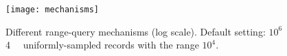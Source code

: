 \begin{figure}[!ht]
	\centering
	\texttt{[image: mechanisms]}
	\caption[Different range-query mechanisms]{
		Different range-query mechanisms (log scale).
		Default setting: $10^6$ \SI{4}{\kibi\byte} uniformly-sampled records with the range $10^4$.
	}%
	\label{figure:mechanisms}
\end{figure}
